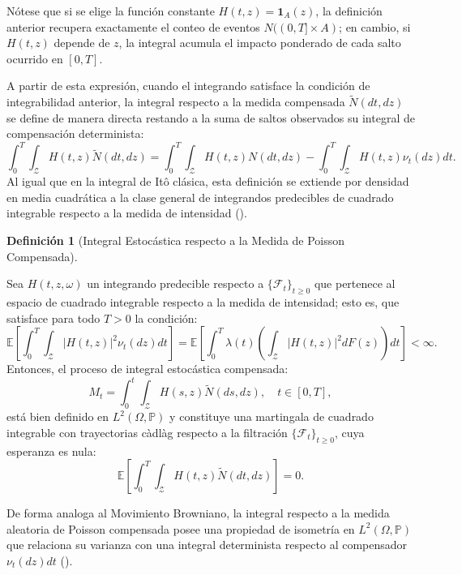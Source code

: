 \documentclass[
  spanish,
  us-letterpaper,
]{scrreprt}
\numberwithin{equation}{section}
\theoremstyle{plain}
\theoremstyle{plain}
\theoremstyle{definition}
\newtheorem{definition}{Definición}[chapter]
\theoremstyle{plain}
\theoremstyle{remark}
\begin{document}
Nótese que si se elige la función constante
\(H(t, z) = \mathbf{1}_A(z)\), la definición anterior recupera
exactamente el conteo de eventos \(N((0, T] \times A)\); en cambio, si
\(H(t, z)\) depende de \(z\), la integral acumula el impacto ponderado
de cada salto ocurrido en \([0, T]\).

A partir de esta expresión, cuando el integrando satisface la condición
de integrabilidad anterior, la integral respecto a la medida compensada
\(\tilde{N}(dt, dz)\) se define de manera directa restando a la suma de
saltos observados su integral de compensación determinista: \[
\int_0^T \int_{\mathcal{Z}} H(t, z) \tilde{N}(dt, dz) = \int_0^T \int_{\mathcal{Z}} H(t, z) N(dt, dz) - \int_0^T \int_{\mathcal{Z}} H(t, z) \nu_t(dz) dt.
\] Al igual que en la integral de Itô clásica, esta definición se
extiende por densidad en media cuadrática a la clase general de
integrandos predecibles de cuadrado integrable respecto a la medida de
intensidad ().

\begin{definition}[Integral Estocástica respecto a la Medida de Poisson
Compensada]\protect\hypertarget{def-integral-saltos}{}\label{def-integral-saltos}

Sea \(H(t, z, \omega)\) un integrando predecible respecto a
\(\{\mathcal{F}_t\}_{t \ge 0}\) que pertenece al espacio de cuadrado
integrable respecto a la medida de intensidad; esto es, que satisface
para todo \(T > 0\) la condición: \[
\mathbb{E} \left[ \int_0^T \int_{\mathcal{Z}} \vert H(t, z) \vert^2 \nu_t(dz) dt \right] = \mathbb{E} \left[ \int_0^T \lambda(t) \left( \int_{\mathcal{Z}} \vert H(t, z) \vert^2 dF(z) \right) dt \right] < \infty.
\] Entonces, el proceso de integral estocástica compensada: \[
M_t = \int_0^t \int_{\mathcal{Z}} H(s, z) \tilde{N}(ds, dz), \quad t \in [0, T],
\] está bien definido en \(L^2(\Omega, \mathbb{P})\) y constituye una
martingala de cuadrado integrable con trayectorias càdlàg respecto a la
filtración \(\{\mathcal{F}_t\}_{t \ge 0}\), cuya esperanza es nula: \[
\mathbb{E}\left[ \int_0^T \int_{\mathcal{Z}} H(t, z) \tilde{N}(dt, dz) \right] = 0.
\]

\end{definition}

De forma analoga al Movimiento Browniano, la integral respecto a la
medida aleatoria de Poisson compensada posee una propiedad de isometría
en \(L^2(\Omega, \mathbb{P})\) que relaciona su varianza con una
integral determinista respecto al compensador \(\nu_t(dz)dt\)
().
\end{document}
